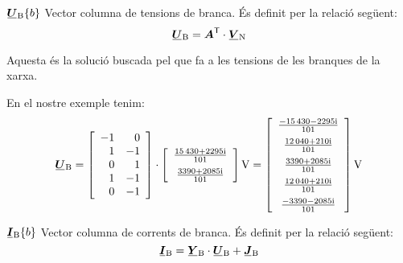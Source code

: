 \begin{list}{}
   \item[$\mcmplx{U}\ped{B}\{b\}$] Vector columna de tensions de branca. És definit per la relació següent:
   \begin{equation}
      \mcmplx{U}\ped{B} = \transpose{\boldsymbol{A}} \cdot \mcmplx{V}\ped{N} \label{eq:ur}
   \end{equation}

   Aquesta és la solució buscada pel que fa a les tensions de les branques de la xarxa.

   En el nostre exemple tenim:
   \[
      \mcmplx{U}\ped{B} =
      \begin{bmatrix}\begin{array}{rr} 
      	 -1 & 0 \\ 1  & -1 \\  0 & 1 \\ 1 & -1 \\ 0 & -1
      \end{array}\end{bmatrix} \cdot
      \begin{bmatrix}\begin{array}{c}
            \frac{\complexnum{15430 + j 2295}}{101} \\[2mm]
            \frac{\complexnum{3390 + j 2085}}{101}
      \end{array}\end{bmatrix}\unit{V} =
      \begin{bmatrix}\begin{array}{c}
           \frac{\complexnum{ -15430 - j 2295}}{101} \\[2mm]
           \frac{\complexnum{12040 + j 210}}{101}  \\[2mm]
           \frac{\complexnum{3390 + j 2085}}{101} \\[2mm]
           \frac{\complexnum{ 12040 + j 210}}{101}  \\[2mm]
           \frac{\complexnum{ -3390 - j 2085}}{101}
      \end{array}\end{bmatrix}\unit{V}
   \]

   \item[$\mcmplx{I}\ped{B}\{b\}$]  Vector columna de corrents de branca. És definit per la relació següent:
   \begin{equation}
      \mcmplx{I}\ped{B} = \mcmplx{Y}\ped{B} \cdot\mcmplx{U}\ped{B} + \mcmplx{J}\ped{B} \label{eq:ir}
   \end{equation}


\end{list}

